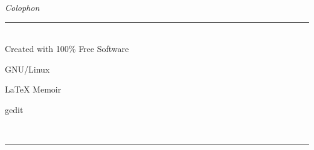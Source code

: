%
%
%
%
%

\begin{vplace}
\centering
\emph{\LARGE Colophon}

\rule{0.5\textwidth}{0.4pt}\\[\baselineskip]

{\tiny Created with 100\% Free Software}

GNU/Linux

{\LaTeX} Memoir

gedit

\rule{0\textwidth}{0pt}\\[\baselineskip]%
\rule{0.5\textwidth}{0.4pt}\\[\baselineskip]
\end{vplace}

